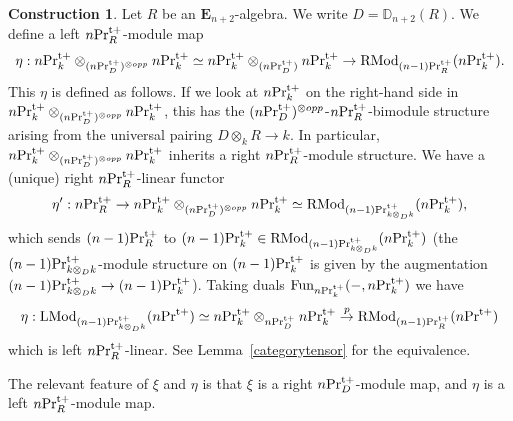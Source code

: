 \documentclass[leqno,12pt]{amsart}
\theoremstyle{plain}
\theoremstyle{definition}
\newtheorem{Construction}[Theorem]{Construction}
\newcommand{\DD}{\mathbb{D}}
\newcommand{\PRTT}{\textup{Pr}^{\textup{t}+}}
\newcommand{\Fun}{\operatorname{Fun}}
\newcommand{\End}{\operatorname{End}}
\newcommand{\LMod}{\operatorname{LMod}}
\newcommand{\RMod}{\operatorname{RMod}}
\begin{document}
\begin{Construction}
\label{etadefine}
Let $R$ be an $\mathbf{E}_{n+2}$-algebra.
We write $D=\DD_{n+2}(R)$.
We define a left $n\PRTT_R$-module map
\[
\eta:n\PRTT_k\otimes_{(n\PRTT_{D})^{\otimes opp}}n\PRTT_k\simeq  n\PRTT_k\otimes_{(n\PRTT_{D})}n\PRTT_k   \to \RMod_{(n-1)\PRTT_R}(n\PRTT_k).
\]
This $\eta$ is defined as follows.
If we look at $n\PRTT_k$ on the right-hand side in 
$n\PRTT_k\otimes_{(n\PRTT_{D})^{\otimes opp}}n\PRTT_k$,
this has the $(n\PRTT_{D})^{\otimes opp}$-$n\PRTT_R$-bimodule structure arising from the universal pairing $D\otimes_k R\to k$.
In particular, $n\PRTT_k\otimes_{(n\PRTT_{D})^{\otimes opp}}n\PRTT_k$ inherits a right $n\PRTT_R$-module structure.
We have a (unique) right $n\PRTT_R$-linear functor 
\[
\eta':n\PRTT_R \to n\PRTT_k\otimes_{(n\PRTT_D)^{\otimes opp}}n\PRTT_k\simeq\RMod_{(n-1)\PRTT_{k\otimes_Dk}}(n\PRTT_k),
\]
which sends $(n-1)\PRTT_R$ to $(n-1)\PRTT_k\in\RMod_{(n-1)\PRTT_{k\otimes_Dk}}(n\PRTT_k)$ (the $(n-1)\PRTT_{k\otimes_Dk}$-module structure on $(n-1)\PRTT_k$ is given by
the augmentation $(n-1)\PRTT_{k\otimes_Dk}\to (n-1)\PRTT_{k}$).
Taking duals $\Fun_{n\PRTT_k}(-,n\PRTT_k)$ 
we have
\[
\eta:\LMod_{(n-1)\PRTT_{k\otimes_{D}k}}(n\PRTT) \simeq n\PRTT_k\otimes_{n\PRTT_{D}}n\PRTT_k \stackrel{p}{\to} \RMod_{(n-1)\PRTT_R}(n\PRTT) 
\]
which is left $n\PRTT_R$-linear. See Lemma~\ref{categorytensor} for the equivalence.

\end{Construction}

The relevant feature of $\xi$ and $\eta$ is that $\xi$ is a right  $n\PRTT_D$-module map,
and $\eta$ is a left $n\PRTT_R$-module map.
\end{document}
